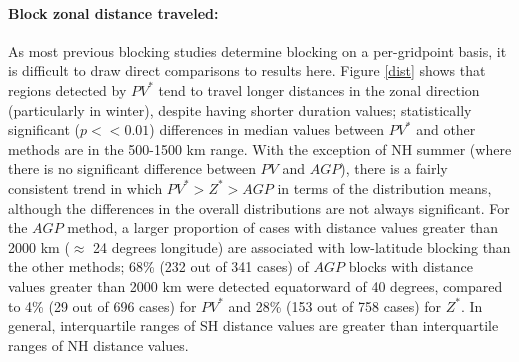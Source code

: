 \documentclass[smallextended]{svjour3}       %
\numberwithin{equation}{section}
\begin{document}
 
\paragraph{Block zonal distance traveled:} As most previous blocking studies determine blocking on a per-gridpoint basis, it is difficult to draw direct comparisons to results here. {\color{blue} Figure \ref{dist} shows that regions detected by $PV^*$ tend to travel longer distances in the zonal direction (particularly in winter), despite having shorter duration values; statistically significant ($p<<0.01$) differences in median values between $PV^*$ and other methods are in the 500-1500 km range. With the exception of NH summer (where there is no significant difference between $PV$ and $AGP$), there is a fairly consistent trend in which $PV^*>Z^*>AGP$ in terms of the distribution means, although the differences in the overall distributions are not always significant. For the $AGP$ method, a larger proportion of cases with distance values greater than 2000 km ($\approx$ 24 degrees longitude) are associated with low-latitude blocking than the other methods; 68\% (232 out of 341 cases) of $AGP$ blocks with distance values greater than 2000 km were detected equatorward of 40 degrees, compared to 4\% (29 out of 696 cases) for $PV^*$ and 28\% (153 out of 758 cases) for $Z^*$. In general, interquartile ranges of SH distance values are greater than interquartile ranges of NH distance values.}



\end{document}
